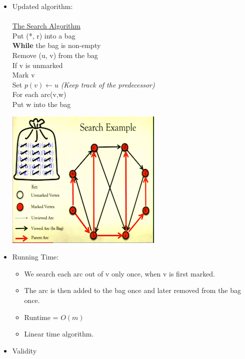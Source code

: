 \documentclass[12pt]{article}
\newcommand{\forceindent}{\leavevmode{\parindent=1em\indent}}
\begin{document}
\begin{itemize}
\item Updated algorithm:\\
\\
\underline{The Search Algorithm}\\
Put (*, r) into a bag\\
\forceindent \textbf{While} the bag is non-empty\\
\forceindent \forceindent Remove (u, v) from the bag\\
\forceindent \forceindent If v is unmarked \\
\forceindent \forceindent \forceindent Mark v\\
\forceindent \forceindent \forceindent Set $p(v) \leftarrow u$ \textit{(Keep track of the predecessor)}\\ 
\forceindent \forceindent \forceindent For each arc(v,w)\\
\forceindent \forceindent \forceindent \forceindent Put w into the bag
\begin{center}

\includegraphics{lecture81}
\end{center}
\item Running Time:
	\begin{itemize}
	\item We search each arc out of v only once, when v is first marked.
	\item The arc is then added to the bag once and later removed from the bag once.
	\item Runtime = $O(m)$
	\item Linear time algorithm.
	\end{itemize}
\item Validity
	

\end{itemize}
\end{document}
